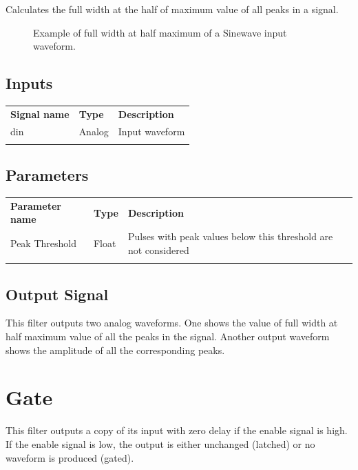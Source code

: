 Calculates the full width at the half of maximum value of all peaks in a signal.

\begin{figure}[h]
\centering
{}
\caption{Example of full width at half maximum of a Sinewave input waveform. }
\label{filter_fwhm}
\end{figure}

\subsection{Inputs}

\begin{tabularx}{16cm}{llX}
\thickhline
\textbf{Signal name} & \textbf{Type} & \textbf{Description} \\
\thickhline
din & Analog & Input waveform \\
\thickhline
\end{tabularx}

\subsection{Parameters}

\begin{tabularx}{16cm}{llX}
\thickhline
\textbf{Parameter name} & \textbf{Type} & \textbf{Description} \\
\thickhline
Peak Threshold & Float & Pulses with peak values below this threshold are not considered\\
\thickhline
\end{tabularx}

\subsection{Output Signal}

This filter outputs two analog waveforms. One shows the value of full width at half maximum value of all the peaks in the signal.
Another output waveform shows the amplitude of all the corresponding peaks.

\pagebreak
\section{Gate}

This filter outputs a copy of its input with zero delay if the enable signal is high. If the enable signal is low,
the output is either unchanged (latched) or no waveform is produced (gated).

